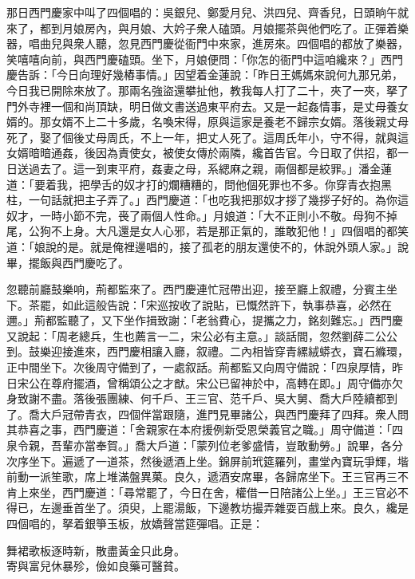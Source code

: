 那日西門慶家中叫了四個唱的：吳銀兒、鄭愛月兒、洪四兒、齊香兒，日頭晌午就來了，都到月娘房內，與月娘、大妗子衆人磕頭。月娘擺茶與他們吃了。正彈着樂器，唱曲兒與衆人聽，忽見西門慶從衙門中來家，進房來。四個唱的都放了樂器，笑嘻嘻向前，與西門慶磕頭。坐下，月娘便問：「你怎的衙門中這咱纔來？」西門慶告訴：「今日向理好幾樁事情。」因望着金蓮說：「昨日王媽媽來說何九那兄弟，今日我已開除來放了。那兩名強盜還攀扯他，教我每人打了二十，夾了一夾，拏了門外寺裡一個和尚頂缺，明日做文書送過東平府去。又是一起姦情事，是丈母養女婿的。那女婿不上二十多歲，名喚宋得，原與這家是養老不歸宗女婿。落後親丈母死了，娶了個後丈母周氏，不上一年，把丈人死了。這周氏年小，守不得，就與這女婿暗暗通姦，後因為責使女，被使女傳於兩隣，纔首告官。今日取了供招，都一日送過去了。這一到東平府，姦妻之母，系緦麻之親，兩個都是絞罪。」潘金蓮道：「要着我，把學舌的奴才打的爛糟糟的，問他個死罪也不多。你穿青衣抱黑柱，一句話就把主子弄了。」{}{}西門慶道：「也吃我把那奴才拶了幾拶子好的。為你這奴才，一時小節不完，䘮了兩個人性命。」月娘道：「大不正則小不敬。母狗不掉尾，公狗不上身。大凡還是女人心邪，若是那正氣的，誰敢犯他！」{}四個唱的都笑道：「娘說的是。就是俺裡邊唱的，接了孤老的朋友還使不的，休說外頭人家。」說畢，擺飯與西門慶吃了。

忽聽前廳鼓樂响，荊都監來了。西門慶連忙冠帶出迎，接至廳上叙禮，分賓主坐下。茶罷，如此這般告說：「宋巡按收了說貼，已慨然許下，執事恭喜，必然在邇。」荊都監聽了，又下坐作揖致謝：「老翁費心，提攜之力，銘刻難忘。」西門慶又說起：「周老總兵，生也薦言一二，宋公必有主意。」談話間，忽然劉薛二公公到。鼓樂迎接進來，西門慶相讓入廳，叙禮。二內相皆穿青縲絨蟒衣，寶石縧環，正中間坐下。次後周守備到了，一處叙話。荊都監又向周守備說：「四泉厚情，昨日宋公在尊府擺酒，曾稱頌公之才猷。宋公已留神於中，高轉在即。」周守備亦欠身致謝不盡。落後張團練、何千戶、王三官、范千戶、吳大舅、喬大戶陸續都到了。喬大戶冠帶青衣，四個伴當跟隨，{}進門見畢諸公，與西門慶拜了四拜。衆人問其恭喜之事，西門慶道：「舍親家在本府援例新受恩榮義官之職。」周守備道：「四泉令親，吾輩亦當奉賀。」喬大戶道：「蒙列位老爹盛情，{}豈敢動勞。」說畢，各分次序坐下。遍遞了一道茶，然後遞酒上坐。錦屏前玳筵羅列，畫堂內寶玩爭輝，堦前動一派笙歌，席上堆滿盤異菓。良久，遞酒安席畢，各歸席坐下。王三官再三不肯上來坐，西門慶道：「尋常罷了，今日在舍，權借一日陪諸公上坐。」王三官必不得已，左邊垂首坐了。須臾，上罷湯飯，下邊教坊撮弄雜耍百戲上來。良久，纔是四個唱的，拏着銀箏玉板，放嬌聲當筵彈唱。正是：

\begin{myquote} 
舞裙歌板逐時新，散盡黃金只此身。\\寄與富兒休暴殄，儉如良藥可醫貧。
\end{myquote} 

